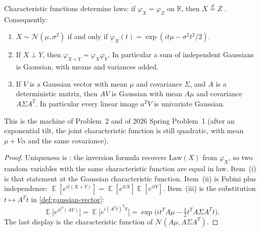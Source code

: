 \documentclass[11pt,a4paper]{article}
\DeclareMathOperator{\E}{\mathbb{E}}
\begin{document}
\begin{proposition}
\label{prop:chf-match-gaussian}
Characteristic functions determine laws: if \( \varphi_X=\varphi_Z \) on \( \mathbb{R} \), then \( X\stackrel{d}{=}Z \) \citep[Theorem~3.3.1]{durrett2010}. Consequently:
\begin{enumerate}[label=\textup{(\roman*)}]
    \item
    \( X\sim\mathcal{N}(\mu,\sigma^{2}) \) if and only if \( \varphi_X(t)=\exp(it\mu-\sigma^{2}t^{2}/2) \).
    \item
    If \( X\perp Y \), then \( \varphi_{X+Y}=\varphi_X\varphi_Y \). In particular a sum of independent Gaussians is Gaussian, with means and variances added.
    \item
    If \( V \) is a Gaussian vector with mean \( \mu \) and covariance \( \Sigma \), and \( A \) is a deterministic matrix, then \( AV \) is Gaussian with mean \( A\mu \) and covariance \( A\Sigma A^{T} \). In particular every linear image \( a^{T}V \) is univariate Gaussian.
\end{enumerate}
This is the machine of Problem~2 and of 2026 Spring Problem~1 (after an exponential tilt, the joint characteristic function is still quadratic, with mean \( \mu+V\alpha \) and the same covariance).
\end{proposition}

\begin{proof}
Uniqueness is \citep[Theorem~3.3.1]{durrett2010}: the inversion formula recovers \( \mathrm{Law}(X) \) from \( \varphi_X \), so two random variables with the same characteristic function are equal in law. Item~(i) is that statement at the Gaussian characteristic function. Item~(ii) is Fubini plus independence: \( \E[e^{it(X+Y)}]=\E[e^{itX}]\E[e^{itY}] \). Item~(iii) is the substitution \( t\mapsto A^{T}t \) in \cref{def:gaussian-vector}:
\[
\E\bigl[e^{it^{T}(AV)}\bigr]
=
\E\bigl[e^{i(A^{T}t)^{T}V}\bigr]
=
\exp\bigl(it^{T}A\mu-\tfrac12 t^{T}A\Sigma A^{T}t\bigr).
\]
The last display is the characteristic function of \( \mathcal{N}(A\mu,A\Sigma A^{T}) \).
\end{proof}
\end{document}
